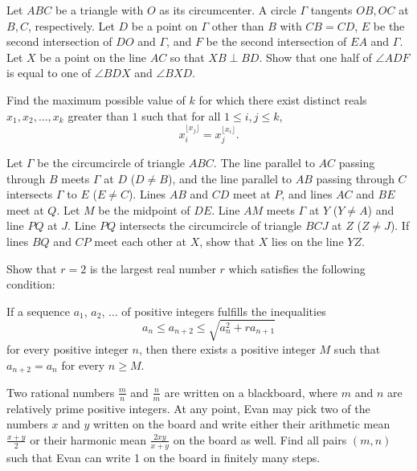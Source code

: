 \documentclass[11pt]{scrartcl}
\begin{document}
\begin{problem}[537574018594693]
Let $ABC$ be a triangle with $O$ as its circumcenter. A circle $\Gamma$ tangents $OB, OC$ at $B, C$, respectively. Let $D$ be a point on $\Gamma$ other than $B$ with $CB=CD$, $E$ be the second intersection of $DO$ and $\Gamma$, and $F$ be the second intersection of $EA$ and $\Gamma$. Let $X$ be a point on the line $AC$ so that $XB\perp BD$. Show that one half of $\angle ADF$ is equal to one of $\angle BDX$ and $\angle BXD$.
\end{problem}
\begin{problem}[540081122403409]
Find the maximum possible value of $k$ for which there exist distinct reals $x_1,x_2,\ldots ,x_k $ greater than $1$ such that for all $1 \leq i, j \leq k$,
$$x_i^{\lfloor x_j \rfloor }= x_j^{\lfloor x_i\rfloor}.$$
\end{problem}
\begin{problem}[541615131309445]
	Let $\Gamma$ be the circumcircle of triangle $ABC$. The line parallel to $AC$ passing through $B$ meets $\Gamma$ at $D$ ($D\neq B$), and the line parallel to $AB$ passing through $C$ intersects $\Gamma$ to $E$ ($E\neq C$). Lines $AB$ and $CD$ meet at $P$, and lines $AC$ and $BE$ meet at $Q$. Let $M$ be the midpoint of $DE$. Line $AM$ meets $\Gamma$ at $Y$ ($Y\neq A$) and line $PQ$ at $J$. Line $PQ$ intersects the circumcircle of triangle $BCJ$ at $Z$ ($Z\neq J$). If lines $BQ$ and $CP$ meet each other at $X$, show that $X$ lies on the line $YZ$.
\end{problem}
\begin{problem}[543318535845123]
Show that $r = 2$ is the largest real number $r$ which satisfies the following condition:

If a sequence $a_1$, $a_2$, $\ldots$ of positive integers fulfills the inequalities
\[a_n \leq a_{n+2} \leq\sqrt{a_n^2+ra_{n+1}}\]for every positive integer $n$, then there exists a positive integer $M$ such that $a_{n+2} = a_n$ for every $n \geq M$.
\end{problem}
\begin{problem}[545015136325290]
	Two rational numbers \(\tfrac{m}{n}\) and \(\tfrac{n}{m}\) are written on a blackboard, where \(m\) and \(n\) are relatively prime positive integers. At any point, Evan may pick two of the numbers \(x\) and \(y\) written on the board and write either their arithmetic mean \(\tfrac{x+y}{2}\) or their harmonic mean \(\tfrac{2xy}{x+y}\) on the board as well. Find all pairs \((m,n)\) such that Evan can write 1 on the board in finitely many steps.
\end{problem}
\end{document}
